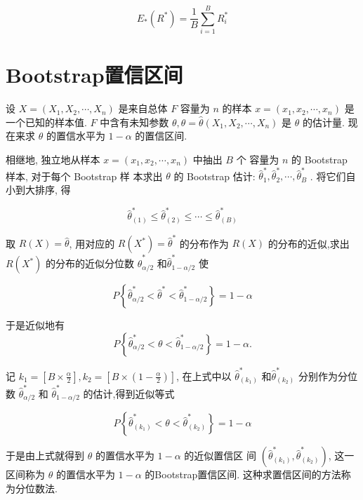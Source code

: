 $$ E_{*}\left(R^{*}\right)=\frac{1}{B} \sum_{i=1}^{B} R_{i}^{*} $$

\section{Bootstrap置信区间}

设 $ X=\left(X_{1}, X_{2}, \cdots, X_{n}\right) $ 是来自总体 $ F $ 容量为 $ n $ 的样本 $ {x}=\left({x}_{1}, {x}_{2}, \cdots, {x}_{n}\right) $ 是一个已知的样本值.  $ {F} $ 中含有未知参数 $ \theta, \hat{\theta}=\hat{\theta}\left(X_{1}, X_{2}, \cdots, X_{n}\right) $ 是 $ \theta $ 的估计量. 现在来求 $ \theta $ 的置信水平为 $ 1-\alpha $ 的置信区间. 

相继地, 独立地从样本 $ {x}=\left(x_{1}, x_{2}, \cdots, x_{n}\right) $ 中抽出 $ B $ 个 容量为 $ n $ 的 Bootstrap 样本, 对于每个 Bootstrap 样 本求出 $ \theta $ 的 Bootstrap 估计: $ \hat{\theta}_{1}^{*}, \hat{\theta}_{2}^{*}, \cdots, \hat{\theta}_{B}^{*} $ .  将它们自 小到大排序, 得

$$ \hat{\theta}_{(1)}^{*} \leq \hat{\theta}_{(2)}^{*} \leq \cdots \leq \hat{\theta}_{(B)}^{*} $$

取 $ R(X)=\hat{\theta} $, 用对应的 $ R\left(X^{*}\right)=\hat{\theta}^{*} $ 的分布作为 $ R(X) $ 的分布的近似,求出 $ R\left(X^{*}\right) $ 的分布的近似分位数 $ \hat{\theta}_{\alpha / 2}^{*} $ 和$ \hat{\theta}_{1-\alpha / 2}^{*} $ 使

$$ P\left\{\hat{\theta}_{\alpha / 2}^{*}<\hat{\theta}^{*}<\hat{\theta}_{1-\alpha / 2}^{*}\right\}=1-\alpha $$

于是近似地有
$$
P\left\{\hat{\theta}_{\alpha / 2}^{*}<\theta<\hat{\theta}_{1-\alpha / 2}^{*}\right\}=1-\alpha .
$$

记 $ {k}_{1}=\left[{B} \times \frac{\alpha}{{2}}\right], {k}_{2}=\left[{B} \times\left({1}-\frac{\alpha}{{2}}\right)\right] $, 在上式中以 $ \hat{\theta}_{\left(k_{1}\right)}^{*} $ 和$ \hat{\theta}_{\left(k_{2}\right)}^{*} $ 分别作为分位数 $ \hat{\theta}_{\alpha / 2}^{*} $ 和 $ \hat{\theta}_{1-\alpha / 2}^{*} $ 的估计,得到近似等式

$$ P\left\{\hat{\theta}_{\left(k_{1}\right)}^{*}<\theta<\hat{\theta}_{\left(k_{2}\right)}^{*}\right\}=1-\alpha $$

于是由上式就得到 $ \theta $ 的置信水平为 $ 1-\alpha $ 的近似置信区 间 $ \left(\hat{\theta}_{\left(k_{1}\right)}^{*}, \hat{\theta}_{\left(k_{2}\right)}^{*}\right) $, 这一区间称为 $ \theta $ 的置信水平为 $ 1-\alpha $ 的Bootstrap置信区间. 这种求置信区间的方法称为分位数法. 

